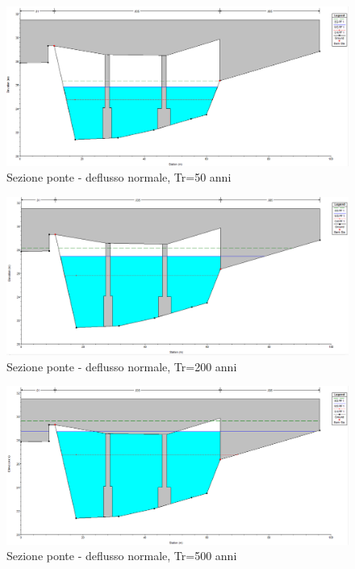 \documentclass[12pt]{article} %
\begin{document}
\begin{figure}[H]
    \centering
    \includegraphics[scale=0.5]{Bridge474.PNG}
    \caption{Sezione ponte - deflusso normale, Tr=50 anni}
\end{figure}

\begin{figure}[H]
    \centering
    \includegraphics[scale=0.5]{Bridge839.PNG}
    \caption{Sezione ponte - deflusso normale, Tr=200 anni}
\end{figure}

\begin{figure}[H]
    \centering
    \includegraphics[scale=0.5]{Bridge1223.PNG}
    \caption{Sezione ponte - deflusso normale, Tr=500 anni}
\end{figure}
\end{document}
